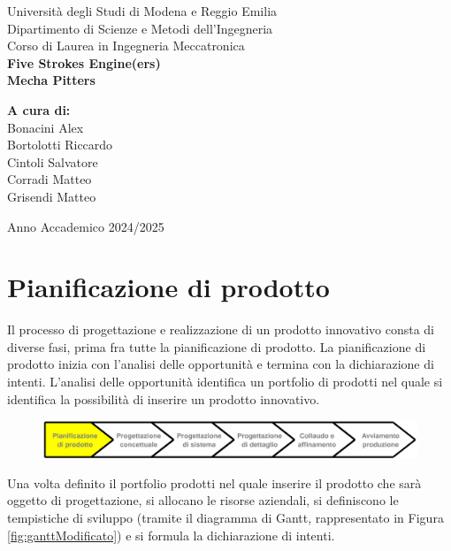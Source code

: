 \documentclass[12pt,a4paper,twoside]{report}  %
\begin{document}
\begin{titlepage}
  \centering

  {\small
    Università degli Studi di Modena e Reggio Emilia\\
    Dipartimento di Scienze e Metodi dell'Ingegneria
  }\\[1cm]
  {\Large Corso di Laurea in Ingegneria Meccatronica}\\[2cm]

  \vfill
  {\Huge\bfseries Five Strokes Engine(ers)}\\[1em]
  {\Huge\bfseries Mecha Pitters}\\[1em]
  \vfill

  \begin{minipage}[t]{0.45\textwidth}
    \raggedright
    \textbf{A cura di:}\\
    Bonacini Alex\\
    Bortolotti Riccardo\\
    Cintoli Salvatore\\
    Corradi Matteo\\ 
    Grisendi Matteo
    
  \end{minipage}%
  \hfill
  \vspace{2cm}

  {\small Anno Accademico 2024/2025}
\end{titlepage}

\renewcommand{\contentsname}{Indice}
\tableofcontents
\newpage
\listoffigures
\newpage
\listoftables

\chapter{ Pianificazione di prodotto}
Il processo di progettazione e realizzazione di un prodotto innovativo consta di diverse fasi, prima fra tutte la pianificazione di prodotto. La pianificazione di prodotto inizia con l'analisi delle opportunità e termina con la dichiarazione di intenti. L'analisi delle opportunità identifica un portfolio di prodotti nel quale si identifica la possibilità di inserire un prodotto innovativo. 
\begin{figure}[H] %
    \centering
    \includegraphics[width=1\linewidth]{pianificazioneProdotto.png}
    \label{fig:pianificazioneProdotto}
\end{figure}
Una volta definito il portfolio prodotti nel quale inserire il prodotto che sarà oggetto di progettazione, si allocano le risorse aziendali, si definiscono le tempistiche di sviluppo (tramite il diagramma di Gantt, rappresentato in Figura \ref{fig:ganttModificato}) e si formula la dichiarazione di intenti.
\end{document}
